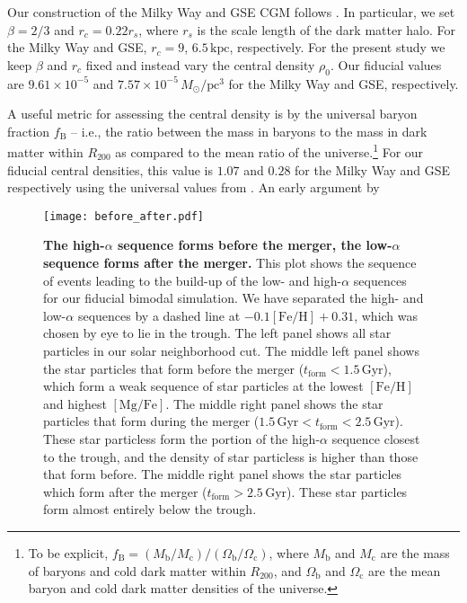 \documentclass[linenumbers, twocolumn]{aastex631}
\newcommand{\Msun}{\ensuremath{M_{\odot}}}
\newcommand{\Gyr}{\ensuremath{\textrm{Gyr}}}
\newcommand{\pc}{\ensuremath{\textrm{pc}}}
\newcommand{\FeH}{\ensuremath{[\textrm{Fe}/\textrm{H}]}}
\newcommand{\MgFe}{\ensuremath{[\textrm{Mg}/\textrm{Fe}]}}
\newcommand{\tform}{\ensuremath{t_{\textrm{form}}}}
\begin{document}
Our construction of the Milky Way and GSE CGM follows
\citet{2023MNRAS.tmp.2070B}. In particular, we set $\beta=2/3$ and $r_c=0.22
r_s$, where $r_s$ is the scale length of the dark matter halo. For the Milky Way
and GSE, $r_c=9$, $6.5\,\textrm{kpc}$, respectively. For the present study we
keep $\beta$ and $r_c$ fixed and instead vary the central density $\rho_0$. Our
fiducial values are $9.61\times10^{-5}$ and $7.57\times10^{-5}\,\Msun/\pc^3$ for
the Milky Way and GSE, respectively.

A useful metric for assessing the central density is by the universal baryon
fraction $f_{\textrm{B}}$ -- i.e., the ratio between the mass in baryons to the
mass in dark matter within $R_{200}$ as compared to the mean ratio of the
universe.\footnote{To be explicit,
$f_{\textrm{B}}=(M_{\textrm{b}}/M_{\textrm{c}})/(\Omega_{\textrm{b}}/\Omega_{\textrm{c}})$,
where $M_{\textrm{b}}$ and $M_{\textrm{c}}$ are the mass of baryons and cold
dark matter within $R_{200}$, and $\Omega_{\textrm{b}}$ and
$\Omega_{\textrm{c}}$ are the mean baryon and cold dark matter densities of the
universe.} For our fiducial central densities, this value is $1.07$ and $0.28$
for the Milky Way and GSE respectively using the universal values from
\cite{2014AA...571A..16P}. An early argument by 

\begin{figure*}
  \centering
  \texttt{[image: before\_after.pdf]}
  \caption{\textbf{The high-$\alpha$ sequence forms before the merger, the low-$\alpha$ sequence forms after the merger.} This plot shows the sequence of events leading to the build-up of the low- and high-$\alpha$ sequences for our fiducial bimodal simulation. We have separated the high- and low-$\alpha$ sequences by a dashed line at $-0.1\FeH + 0.31$, which was chosen by eye to lie in the trough. The left panel shows all star particles in our solar neighborhood cut. The middle left panel shows the star particles that form before the merger ($\tform < 1.5\,\Gyr$), which form a weak sequence of star particles at the lowest \FeH and highest \MgFe. The middle right panel shows the star particles that form during the merger ($1.5\,\Gyr < \tform < 2.5\,\Gyr$). These star particless form the portion of the high-$\alpha$ sequence closest to the trough, and the density of star particless is higher than those that form before. The middle right panel shows the star particles which form after the merger ($\tform > 2.5\,\Gyr$). These star particles form almost entirely below the trough.}
  \label{fig:before_after}
\end{figure*}
\end{document}
